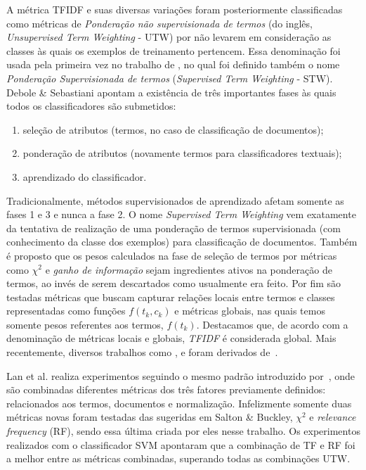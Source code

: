 A métrica \textsc{TFIDF} e suas diversas variações foram posteriormente classificadas como métricas de \textit{Ponderação não supervisionada de termos} (do inglês, \textit{Unsupervised Term Weighting} - \textsc{UTW}) por não levarem em consideração as classes às quais os exemplos de treinamento pertencem. Essa denominação foi usada pela primeira vez no trabalho de \cite{Debole03}, no qual foi definido também o nome \textit{Ponderação Supervisionada de termos} (\textit{Supervised Term Weighting} - \textsc{STW}). 
Debole \& Sebastiani apontam a existência de três importantes fases às quais todos os classificadores são submetidos: 
\begin{enumerate}
\item seleção de atributos (termos, no caso de classificação de documentos);
\item ponderação de atributos (novamente termos para classificadores textuais);
\item aprendizado do classificador.
\end{enumerate}
Tradicionalmente, métodos supervisionados de aprendizado afetam somente as fases 1 e 3 e nunca a fase 2. O nome \textit{Supervised Term Weighting} vem exatamente da tentativa de realização de uma ponderação de termos supervisionada (com conhecimento da classe dos exemplos) para classificação de documentos. Também é proposto que os pesos calculados na fase de seleção de termos por métricas como $\chi^2$ e \textit{ganho de informação} sejam ingredientes ativos na ponderação de termos, ao invés de serem descartados como usualmente era feito. Por fim são testadas métricas que buscam capturar relações locais entre termos e classes representadas como funções $f(t_k, c_k)$ e métricas globais, nas quais temos somente pesos referentes aos termos, $f(t_k)$. Destacamos que, de acordo com a denominação de métricas locais e globais, \textit{TFIDF} é considerada global. 
Mais recentemente, diversos trabalhos como \cite{Lan05}, \cite{Batal09} e \cite{Liu09} foram derivados de~\cite{Debole03}.

Lan et al. realiza experimentos seguindo o mesmo padrão introduzido por~\cite{Salton88}, onde são combinadas diferentes métricas dos três fatores previamente definidos: relacionados aos termos, documentos e normalização. Infelizmente somente duas métricas novas foram testadas das sugeridas em Salton \& Buckley, $\chi^2$ e \textit{relevance frequency} (\textsc{RF}), sendo essa última criada por eles nesse trabalho. Os experimentos realizados com o classificador \textsc{SVM} apontaram que a combinação de \textsc{TF} e \textsc{RF} foi a melhor entre as métricas combinadas, superando todas as combinações \textsc{UTW}. 

